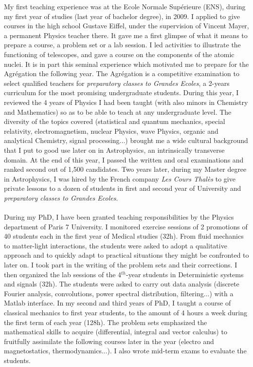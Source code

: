 \documentclass[a4paper,12pt,onecolumn]{article}
\begin{document}
My first teaching experience was at the Ecole Normale Sup\'erieure (ENS), during my first year of studies (last year of bachelor degree), in 2009. I applied to give courses in the high school Gustave Eiffel, under the supervision of Vincent Mayer, a permanent Physics teacher there. It gave me a first glimpse of what it means to prepare a course, a problem set or a lab session. I led activities to illustrate the functioning of telescopes, and gave a course on the components of the atomic nuclei. It is in part this seminal experience which motivated me to prepare for the Agr\'egation the following year. The Agr\'egation is a competitive examination to select qualified teachers for \textit{preparatory classes to Grandes Ecoles}, a 2-years curriculum for the most promising undergraduate students. During this year, I reviewed the 4 years of Physics I had been taught (with also minors in Chemistry and Mathematics) so as to be able to teach at any undergraduate level. The diversity of the topics covered (statistical and quantum mechanics, special relativity, electromagnetism, nuclear Physics, wave Physics, organic and analytical Chemistry, signal processing...) brought me a wide cultural background that I put to good use later on in Astrophysics, an intrinsically transverse domain. At the end of this year, I passed the written and oral examinations and ranked second out of 1,500 candidates. Two years later, during my Master degree in Astrophysics, I was hired by the French company \textit{Les Cours Thal\`es} to give private lessons to a dozen of students in first and second year of University and \textit{preparatory classes to Grandes Ecoles}.\\ \\
\indent During my PhD, I have been granted teaching responsibilities by the Physics department of Paris 7 University. I monitored exercise sessions of 2 promotions of 40 students each in the first year of Medical studies (32h). From fluid mechanics to matter-light interactions, the students were asked to adopt a qualitative approach and to quickly adapt to practical situations they might be confronted to later on. I took part in the writing of the problem sets and their corrections. I then organized the lab sessions of the 4$^{th}$-year students in Deterministic systems and signals (32h). The students were asked to carry out data analysis (discrete Fourier analysis, convolutions, power spectral distribution, filtering...) with a Matlab interface. In my second and third years of PhD, I taught a course of classical mechanics to first year students, to the amount of 4 hours a week during the first term of each year (128h). The problem sets emphasized the mathematical skills to acquire (differential, integral and vector calculus) to fruitfully assimilate the following courses later in the year (electro and magnetostatics, thermodynamics...). I also wrote mid-term exams to evaluate the students.\\ \\
\end{document}
